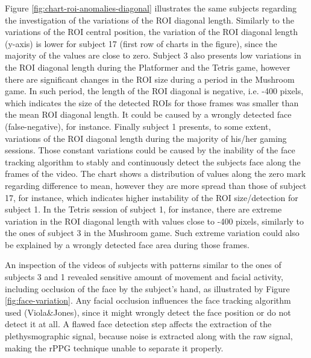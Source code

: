 Figure \ref{fig:chart-roi-anomalies-diagonal} illustrates the same subjects regarding the investigation of the variations of the ROI diagonal length. Similarly to the variations of the ROI central position, the variation of the ROI diagonal length (y-axis) is lower for subject 17 (first row of charts in the figure), since the majority of the values are close to zero. Subject 3 also presents low variations in the ROI diagonal length during the Platformer and the Tetris game, however there are significant changes in the ROI size during a period in the Mushroom game. In such period, the length of the ROI diagonal is negative, i.e. -400 pixels, which indicates the size of the detected ROIs for those frames was smaller than the mean ROI diagonal length. It could be caused by a wrongly detected face (false-negative), for instance. Finally subject 1 presents, to some extent, variations of the ROI diagonal length during the majority of his/her gaming sessions. Those constant variations could be caused by the inability of the face tracking algorithm to stably and continuously detect the subjects face along the frames of the video. The chart shows a distribution of values along the zero mark regarding difference to mean, however they are more spread than those of subject 17, for instance, which indicates higher instability of the ROI size/detection for subject 1. In the Tetris session of subject 1, for instance, there are extreme variation in the ROI diagonal length with values close to -400 pixels, similarly to the ones of subject 3 in the Mushroom game. Such extreme variation could also be explained by a wrongly detected face area during those frames.

An inspection of the videos of subjects with patterns similar to the ones of subjects 3 and 1 revealed sensitive amount of movement and facial activity, including occlusion of the face by the subject's hand, as illustrated by Figure \ref{fig:face-variation}. Any facial occlusion influences the face tracking algorithm used (Viola\&Jones), since it might wrongly detect the face position or do not detect it at all. A flawed face detection step affects the extraction of the plethysmographic signal, because noise is extracted along with the raw signal, making the rPPG technique unable to separate it properly.

